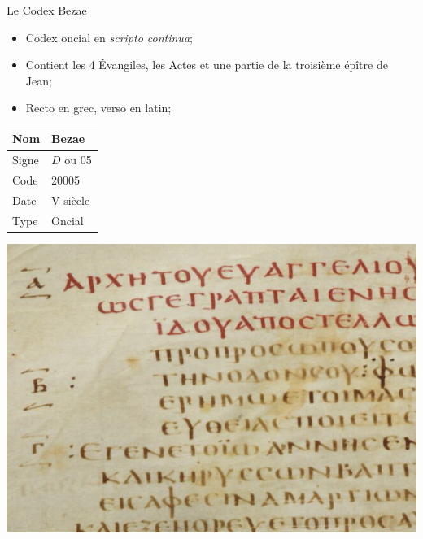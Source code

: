 \documentclass[11pt]{beamer}
\begin{document}
\begin{frame}{Le Codex Bezae}
    \begin{block}{}
        \begin{itemize}
            \item Codex oncial en \textit{scripto continua};
            \item Contient les 4 Évangiles, les Actes et une partie de la troisième épître de Jean;
            \item Recto en grec, verso en latin;
        \end{itemize}
    \end{block}
        \vfill
    \begin{minipage}{.4\textwidth}
\begin{tabular}{l|l}
     Nom & Bezae \\
     \hline
     Signe & $D$ ou 05 \\
     \hline
     Code & 20005\\
     \hline
     Date & V\ieme{} siècle \\
     \hline
     Type & Oncial \\
\end{tabular}
\end{minipage}
\hfill
\begin{minipage}{.45\textwidth}
    \includegraphics[scale=.4]{img/bezae_mk_1_1.png}
\end{minipage}
\end{frame}

\end{document}
